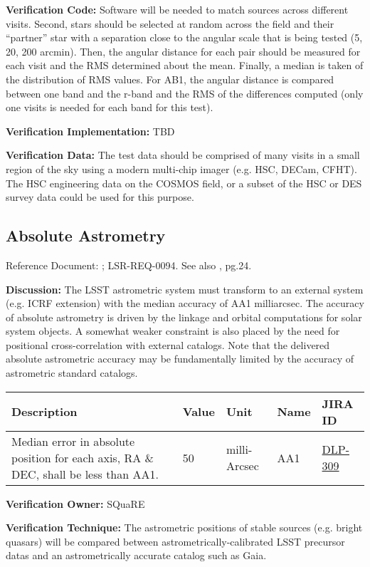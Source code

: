 \documentclass[DM,lsstdraft,toc]{lsstdoc}
\newcommand{\jira}[1]{\href{https://jira.lsstcorp.org/browse/#1}{#1}}
\begin{document}
\textbf{Verification Code:} Software will be needed to match sources
across different visits. Second, stars should be selected at random
across the field and their ``partner'' star with a separation close to
the angular scale that is being tested (5, 20, 200 arcmin). Then, the
angular distance for each pair should be measured for each visit and the
RMS determined about the mean. Finally, a median is taken of the
distribution of RMS values. For AB1, the angular distance is compared
between one band and the r-band and the RMS of the differences computed
(only one visits is needed for each band for this test).

\textbf{Verification Implementation:} TBD

\textbf{Verification Data:} The test data should be comprised of many
visits in a small region of the sky using a modern multi-chip imager
(e.g. HSC, DECam, CFHT). The HSC engineering data on the COSMOS field,
or a subset of the HSC or DES survey data could be used for this
purpose.

\subsection{Absolute Astrometry}\label{absolute-astrometry}

Reference Document: ; LSR-REQ-0094. See also \SRD, pg.24.

\textbf{Discussion:} The LSST astrometric system must transform to an
external system (e.g. ICRF extension) with the median accuracy of AA1
milliarcsec. The accuracy of absolute astrometry is driven by the
linkage and orbital computations for solar system objects. A somewhat
weaker constraint is also placed by the need for positional
cross-correlation with external catalogs. Note that the delivered
absolute astrometric accuracy may be fundamentally limited by the
accuracy of astrometric standard catalogs.

\begin{longtable}[]{@{}p{}llll@{}}
\toprule
Description & Value & Unit & Name & JIRA ID\tabularnewline
\midrule
\endhead
Median error in absolute position for each axis, RA \& DEC, shall be
less than AA1. & 50 & milli-Arcsec & AA1 & \jira{DLP-309}\tabularnewline
\bottomrule
\end{longtable}

\textbf{Verification Owner:} SQuaRE

\textbf{Verification Technique:} The astrometric positions of stable
sources (e.g. bright quasars) will be compared between
astrometrically-calibrated LSST precursor datas and an astrometrically
accurate catalog such as Gaia.
\end{document}
